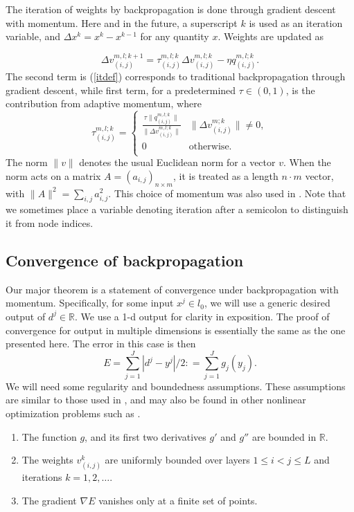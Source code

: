 \documentclass{jcmlatex}
\begin{document}
The iteration of weights by backpropagation is done through gradient descent with momentum. Here and in the future, a superscript $k$ is used as an iteration variable, and $\Delta x^k = x^k - x^{k-1}$ for any quantity $x$.   Weights are updated as

\begin{equation}\label{itdef}
\Delta v^{m,l;k+1}_{(i,j)}= \tau^{m,l;k}_{(i,j)}\Delta v^{m,l;k}_{(i,j)}
- \eta q^{m,l;k}_{(i,j)}.
\end{equation}
The second term is (\ref{itdef}) corresponds to traditional backpropagation through gradient descent, while first term, for a predetermined $\tau \in (0,1)$, is the contribution from adaptive momentum, where
\begin{equation}\label{taudef}
\tau^{m,l;k}_{(i,j)} = \begin{cases}\frac{\tau\|q^{m,l;k}_{(i,j)}\|}{\|\Delta
v^{m,l;k}_{(i,j)}\|} &  \|\Delta v^{m;k}_{(i,j)}\| \neq 0,\\
0  & \mathrm{otherwise}. \\
\end{cases}
\end{equation}
The norm $\|v\|$ denotes the usual Euclidean norm for a vector $v$. When the norm acts on a matrix $A = (a_{i,j})_{n\times m}$, it is treated as a
length $n\cdot m$ vector, with $\|A\|^2 = \sum_{i,j} a_{i,j}^2$. This choice of momentum was also used in \cite{zhang2006}. Note that  we sometimes place a variable denoting iteration after a semicolon to distinguish it from node indices.

\subsection{Convergence of backpropagation}

Our major theorem is a statement of convergence under backpropagation with momentum.   Specifically, for some input $x^j \in l_0$, we will use a generic desired output of $d^j \in \mathbb{R}$. We use a 1-d output for clarity in exposition.  The proof of convergence for output in multiple dimensions is essentially the same as the one presented here. The error in this case is then
\begin{equation}
E = \sum_{j = 1}^J |d^j-y^j|/2: =  \sum_{j = 1}^J g_j(y_j). \label{edef}
\end{equation}We will need some regularity and boundedness assumptions.  These assumptions are similar to those used in \cite{wu2008convergence}, and may also be found in other nonlinear optimization problems such as \cite{gori1996}.
\begin{ass} \label{assumes}
\hspace{0.5em}
\begin{enumerate}
\item The function $g$, and its first two derivatives $g'$ and $g''$ are bounded in $\mathbb R$.
\item The weights $v_{(i,j)}^k$ are uniformly bounded over layers $1 \le i<j \le L$ and iterations $k = 1, 2, \dots.$
\item The gradient $\nabla E$ vanishes only at a finite set of points.
\end{enumerate}
\end{ass}
\end{document}
